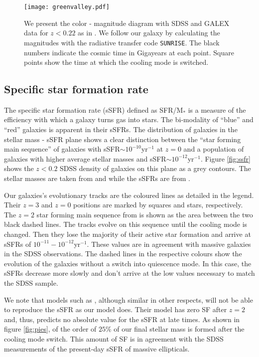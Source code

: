 \documentclass[useAMS,usenatbib]{mnras}
\begin{document}
\begin{figure*}
  \centering
 \texttt{[image: greenvalley.pdf]}
  \caption{We present the color - magnitude diagram with SDSS and
    GALEX data for $z<0.22$ as in \citet{Salim2007}. We follow our
    galaxy by calculating the magnitudes with the radiative transfer
    code \texttt{SUNRISE}. The black numbers indicate the cosmic time
    in Gigayears at each point. {Square points show the time at which
    the cooling mode is switched.}}
  \label{fig:greenvalley}
\end{figure*}


\subsection{Specific star formation rate}
\label{sec:ssfr}
The specific star formation rate (sSFR) defined as SFR/M$_*$ is a
measure of the efficiency with which a galaxy turns gas into
stars. The bi-modality of ``blue'' and ``red'' galaxies is apparent in
their sSFRs. The distribution of galaxies in the stellar mass - sSFR
plane shows a clear distinction between the ``star forming main
sequence'' of galaxies with sSFR$\sim10^{-10}$yr$^{-1}$ at $z=0$ and a
population of galaxies with higher average stellar masses and
sSFR$\sim10^{-12}$yr$^{-1}$. Figure \ref{fig:ssfr} shows the $z<0.2$
SDSS density of galaxies on this plane as a grey
contours. The stellar masses are taken from \citet{Kauffmann2003} and
\citet{Salim2007} while the sSFRs are from \citet{Brinchmann2004}.

Our galaxies's evolutionary tracks are the coloured lines as detailed
in the legend. Their $z=3$ and $z=0$ positions are marked by squares
and stars, respectively.  The $z=2$ star forming main sequence from
\citet{Daddi2007} is shown as the area between the two black dashed
lines. The tracks evolve on this sequence until the cooling mode is
changed. Then they lose the majority of their active star formation
and arrive at sSFRs of $10^{-11}-10^{-12}$yr$^{-1}$. These values are
in agreement with massive galaxies in the SDSS observations.  The
dashed lines in the respective colours show the evolution of the
galaxies without a switch into quiescence mode. In this case, the
sSFRs decrease more slowly and don't arrive at the low values
necessary to match the SDSS sample.

{We note that models such as \citet{Dutton2015}, although similar
  in other respects, will not be able to reproduce the sSFR as our
  model does. Their model has zero SF after $z=2$ and, thus, predicts no
  absolute value for the sSFR at late times. As shown in figure
  \ref{fig:pies}, of the order of $25\%$ of our final stellar mass is
  formed after the cooling mode switch. This amount of SF is in
  agreement with the SDSS measurements of the present-day sSFR of
  massive ellipticals.}
\end{document}
